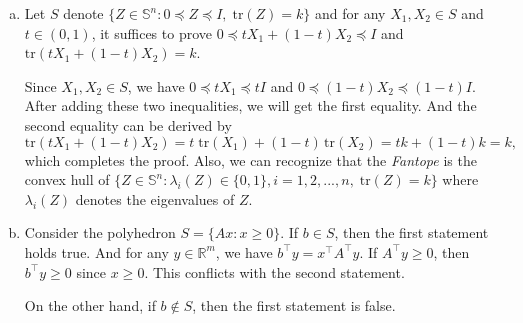 \documentclass[12pt,letterpaper]{article}
\def\R{\mathbb{R}}
\def\S{\mathbb{S}}
\def\tr{\mathrm{tr}}
\begin{document}
\begin{enumerate}[(a)]
\begin{enumerate}[i.]
		{\bf Closeness.} Given a point $x \notin P$, then we have $Ax \npreceq b$. There exists an integer $i\in \{1,2,...,m\}$, satisfying $a_i^\top x > b$ where $a_i^\top$ denotes the i-th row of $A$. Let $\epsilon = \frac{1}{2n \max_{j=1,2,...,n} \{|a_{ij}|\}}(a_i^\top x - b)$, then for any point $x' \in O(x,\epsilon)$, we have $a_i^\top x' > b$. Thus, $Ax \npreceq b$, which suggests the complement set of $P$ is open. This reflects the closeness of set $P$.
		
		{\bf Convexity.} For $x_1, x_2 \in P$, we have $Ax_1 \preceq b$ and $Ax_2 \preceq b$. Then, for any $t\in(0, 1)$, we have
		\begin{equation}
		A(t x_1 + (1-t)x_2) 
		= t Ax_1 + (1-t) Ax_2 
		\preceq t b + (1-t) b
		= b.
		\end{equation}
		Hence, $t x_1 + (1-t) x_2 \in P$, which demonstrates the convexity of set $P$.
		
		\item The statement tells us that a projection map takes polyhedra to polyhedra. Obviously, $Q=\{(x,y):x\in P,y=Ax\}$ is a polyhedron. Considering the projection $(x,y)\rightarrow y$ taking $Q$ to $A(P)$, it turns out that $A(P)$ is a polyhedron.
		
	\end{enumerate}
	{\bf Bonus.} Similar to (b, ii.), just consider the set $Q=\{(x,y):x\in P,Ay=x\}$ and take the projection map $(x,y)\rightarrow y$.

	\item Let $S$ denote $\{ Z \in \S^n : 0 \preceq Z \preceq I, \; \tr(Z)=k \}$ and for any $X_1,X_2\in S$ and $t\in(0,1)$, it suffices to prove $0 \preceq tX_1+(1-t)X_2 \preceq I$ and $\tr(tX_1+(1-t)X_2)=k$.
	
	Since $X_1,X_2\in S$, we have $0 \preceq tX_1 \preceq tI$ and $0 \preceq (1-t)X_2 \preceq (1-t)I$. After adding these two inequalities, we will get the first equality. And the second equality can be derived by
	\begin{equation}
	\tr(tX_1+(1-t)X_2)
	= t \; \tr(X_1) + (1-t) \,\tr(X_2)
	= t k + (1-t) k
	=k,
	\end{equation}
	which completes the proof. Also, we can recognize that the {\em Fantope} is the convex hull of $\{ Z \in \S^n :  \lambda_i(Z) \in \{0,1\}, i=1,2,...,n, \; \tr(Z)=k \}$ where $\lambda_i(Z)$ denotes the eigenvalues of $Z$. 
	
	\item Consider the polyhedron $S=\{Ax:x\ge 0\}$. If $b \in S$, then the first statement holds true. And for any $y\in\R^m$, we have $b^\top y = x^\top A^\top y$. If $A^\top y \ge 0$, then $b^\top y \ge 0$ since $x\ge 0$. This conflicts with the second statement. 
	
	On the other hand, if $b \notin S$, then the first statement is false.	
	\end{enumerate}
	
\end{document}
